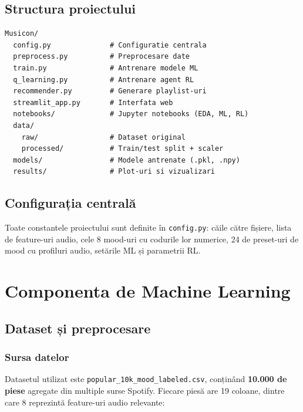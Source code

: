 \documentclass[12pt,a4paper]{article}
\begin{document}
\subsection{Structura proiectului}

\begin{lstlisting}[language={}, caption={Structura fisierelor proiectului}]
Musicon/
  config.py              # Configuratie centrala
  preprocess.py          # Preprocesare date
  train.py               # Antrenare modele ML
  q_learning.py          # Antrenare agent RL
  recommender.py         # Generare playlist-uri
  streamlit_app.py       # Interfata web
  notebooks/             # Jupyter notebooks (EDA, ML, RL)
  data/
    raw/                 # Dataset original
    processed/           # Train/test split + scaler
  models/                # Modele antrenate (.pkl, .npy)
  results/               # Plot-uri si vizualizari
\end{lstlisting}

\subsection{Configurația centrală}

Toate constantele proiectului sunt definite în \texttt{config.py}: căile către fișiere, lista de feature-uri audio, cele 8 mood-uri cu codurile lor numerice, 24 de preset-uri de mood cu profiluri audio, setările ML și parametrii RL.

\FloatBarrier

\section{Componenta de Machine Learning}

\subsection{Dataset și preprocesare}
\label{sec:dataset}

\subsubsection{Sursa datelor}

Datasetul utilizat este \texttt{popular\_10k\_mood\_labeled.csv}, conținând \textbf{10.000 de piese} agregate din multiple surse Spotify. Fiecare piesă are 19 coloane, dintre care 8 reprezintă feature-uri audio relevante:
\end{document}
